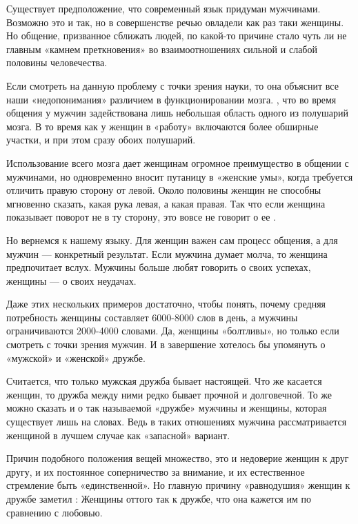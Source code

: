 Существует предположение, что современный язык придуман мужчинами. Возможно это и так, но в совершенстве речью овладели как раз таки женщины. Но общение, призванное сближать людей, по какой-то причине стало чуть ли не главным «камнем преткновения» во взаимоотношениях сильной и слабой половины человечества.

Если смотреть на данную проблему с точки зрения науки, то она объяснит все наши «недопонимания» различием в функционировании мозга. , что во время общения у мужчин задействована лишь небольшая область одного из полушарий мозга. В то время как у женщин в «работу» включаются более обширные участки, и при этом сразу обоих полушарий.

Использование всего мозга дает женщинам огромное преимущество в общении с мужчинами, но одновременно вносит путаницу в «женские умы», когда требуется отличить правую сторону от левой. Около половины женщин не способны мгновенно сказать, какая рука левая, а какая правая. Так что если женщина показывает поворот не в ту сторону, это вовсе не говорит о ее .

Но вернемся к нашему языку. Для женщин важен сам процесс общения, а для мужчин --- конкретный результат. Если мужчина думает молча, то женщина предпочитает  вслух. Мужчины больше любят говорить о своих успехах, женщины --- о своих неудачах.

Даже этих нескольких примеров достаточно, чтобы понять, почему средняя потребность женщины составляет 6000-8000 слов в день, а мужчины ограничиваются 2000-4000 словами.
Да, женщины «болтливы», но только если смотреть с точки зрения мужчин.
И в завершение хотелось бы упомянуть о «мужской» и «женской» дружбе.

Считается, что только мужская дружба бывает настоящей. Что же касается женщин, то дружба между ними редко бывает прочной и долговечной. То же можно сказать и о так называемой «дружбе» мужчины и женщины, которая существует лишь на словах. Ведь в таких отношениях мужчина рассматривается женщиной в лучшем случае как «запасной» вариант.

Причин подобного положения вещей множество, это и недоверие женщин к друг другу, и их постоянное соперничество за внимание, и их естественное стремление быть «единственной». Но главную причину «равнодушия» женщин к дружбе заметил : Женщины оттого так  к дружбе, что она кажется им  по сравнению с любовью.

